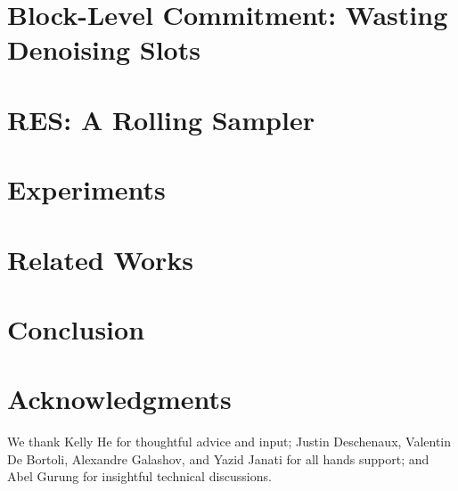 \documentclass[11pt, a4paper, logo, copyright, gdm]{google}
\begin{document}
\section{Block-Level Commitment: Wasting Denoising Slots}
\label{sec:too-late}


\section{RES: A Rolling Sampler}
\label{sec:method}


\section{Experiments}
\label{sec:experiments}


\section{Related Works}
\label{sec:adjacentworks}


\section{Conclusion}


\section*{Acknowledgments}
We thank Kelly He for thoughtful advice and input; Justin Deschenaux, Valentin De Bortoli, Alexandre Galashov, and Yazid Janati for all hands support; and Abel Gurung for insightful technical discussions.
\clearpage
\begingroup
\small
\setlength{\bibsep}{3pt}
\setlength{\parskip}{0pt}


\endgroup

\clearpage
\appendix

\end{document}
